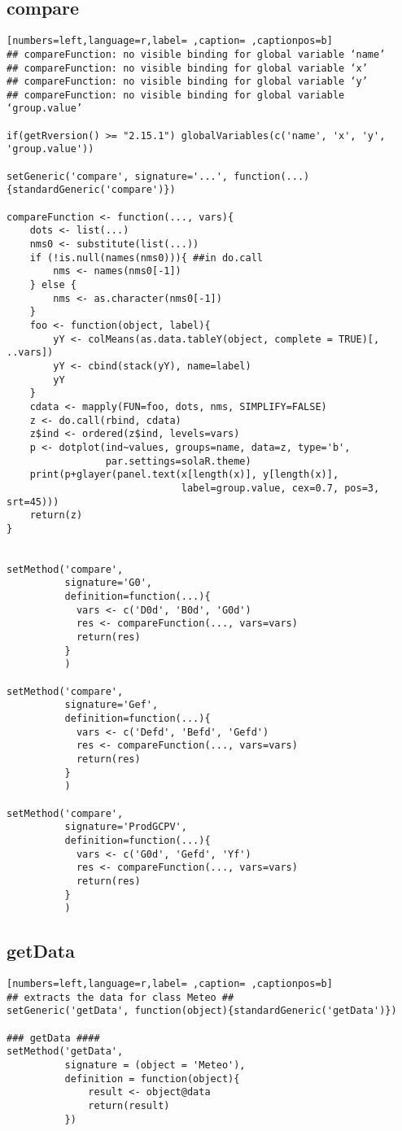\subsection{compare}
\label{sec:orgea5275f}
\begin{lstlisting}[numbers=left,language=r,label= ,caption= ,captionpos=b]
## compareFunction: no visible binding for global variable ‘name’
## compareFunction: no visible binding for global variable ‘x’
## compareFunction: no visible binding for global variable ‘y’
## compareFunction: no visible binding for global variable ‘group.value’

if(getRversion() >= "2.15.1") globalVariables(c('name', 'x', 'y', 'group.value'))

setGeneric('compare', signature='...', function(...){standardGeneric('compare')})

compareFunction <- function(..., vars){
    dots <- list(...)
    nms0 <- substitute(list(...))
    if (!is.null(names(nms0))){ ##in do.call
        nms <- names(nms0[-1])
    } else {
        nms <- as.character(nms0[-1])
    }
    foo <- function(object, label){
        yY <- colMeans(as.data.tableY(object, complete = TRUE)[, ..vars])
        yY <- cbind(stack(yY), name=label)
        yY
    }
    cdata <- mapply(FUN=foo, dots, nms, SIMPLIFY=FALSE)
    z <- do.call(rbind, cdata)
    z$ind <- ordered(z$ind, levels=vars)
    p <- dotplot(ind~values, groups=name, data=z, type='b',
                 par.settings=solaR.theme)
    print(p+glayer(panel.text(x[length(x)], y[length(x)],
                              label=group.value, cex=0.7, pos=3, srt=45)))
    return(z)
}


setMethod('compare',
          signature='G0',
          definition=function(...){
            vars <- c('D0d', 'B0d', 'G0d')
            res <- compareFunction(..., vars=vars)
            return(res)
          }
          )

setMethod('compare',
          signature='Gef',
          definition=function(...){
            vars <- c('Defd', 'Befd', 'Gefd')
            res <- compareFunction(..., vars=vars)
            return(res)
          }
          )

setMethod('compare',
          signature='ProdGCPV',
          definition=function(...){
            vars <- c('G0d', 'Gefd', 'Yf')
            res <- compareFunction(..., vars=vars)
            return(res)
          }
          )
\end{lstlisting}
\subsection{getData}
\label{sec:org438dc74}
\begin{lstlisting}[numbers=left,language=r,label= ,caption= ,captionpos=b]
## extracts the data for class Meteo ##
setGeneric('getData', function(object){standardGeneric('getData')})

### getData ####
setMethod('getData',
          signature = (object = 'Meteo'),
          definition = function(object){
              result <- object@data
              return(result)
          })
\end{lstlisting}
